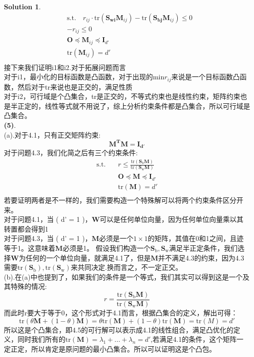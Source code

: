 \documentclass[a4paper]{article}
\numberwithin{equation}{section}
\theoremstyle{definition}
\newtheorem*{solution}{Solution}
\def \Sw {\mathbf{S}_{\mathrm{w}}}
\def \Sb {\mathbf{S}_{\mathrm{b}}}
\def \O {\mathbf{O}}
\def \I {\mathbf{I}}
\def \M {\mathbf{M}}
\def \W {\mathbf{W}}
\newcommand\sbr[1]{\left( #1 \right)}
\newcommand\tr[1]{\mathrm{tr}\sbr{#1}}
\begin{document}
\begin{solution}
\begin{equation}
\begin{aligned}
		& \mathrm{s.t.} \quad  r_{ij} \cdot \tr{\mathbf{S_{wi}} \M_{ij}} - \tr{\mathbf{S_{bj}} \M_{ij}} \leqslant 0 \\
		& -r_{ij} \leqslant 0    \\
		& \O \preccurlyeq \M_{ij} \preccurlyeq \I_{d'}  \\
		& \tr{\M_{ij}} = d'  \\
		\end{aligned}
	\label{equation}
	\end{equation}
	接下来我们证明i1和i2.对于拓展问题而言\\
	对于i1，最小化的目标函数是凸函数，对于出现的min$r_{ij}$来说是一个目标函数凸函数，然后对于tr来说也是正交的，满足性质\\
	对于i2，可行域是个凸集合，tr是正交的，不等式约束也是线性约束，矩阵约束也是半正定的，线性等式就不用说了，综上分析约束条件都是凸集合，所以可行域是凸集合。\\
	\textbf{(5)}.\\
	(a).对于4.1，只有正交矩阵约束:
	\[
		\mathbf{M^T}\mathbf{M} = \mathbf{I_{d'}}	
	\]
	对于问题4.3，我们化简之后有三个约束条件:
	\begin{equation}
		\begin{aligned}                                        
			\mathrm{s.t.} \quad & r \leq \frac{\tr{\Sb \M}}{\tr{\Sw \M}}        \\
			\quad               & \O \preccurlyeq \M \preccurlyeq \I_{d'}       \\
			\quad               & \tr{\M} = d'                                  \\
		\end{aligned}
		\label{lda1-slack}
	\end{equation}
	若要证明两者是不一样的，我们需要构造一个特殊解可以将两个约束条件区分开来。\\
	对于问题4.1，当 ( d' = 1 )，$\W$可以是任何单位向量，因为任何单位向量乘以其转置都会得到1\\
	对于问题4.3，当 ( d' = 1 )，$\M$必须是一个$1 \times 1 $的矩阵，其值在0和1之间，且迹等于1。这意味着$\M$必须是1。
	假设我们构造一个$\Sb,\Sw$满足半正定条件，我们选择$\W$为任何的一个单位向量，就满足4.1了，但是$\M$并不满足4.3的约束，因为4.3需要$\tr{\Sb},\tr{\Sw}$来共同决定.换而言之，不一定正交。\\
    (b).在(a)中也提到了，如果我们的条件是一个等式，我们其实可以得到这是一个及其特殊的情况:\\
	\[
		r = \frac{\text{tr}(\Sb \M)}{\text{tr}(\Sw \M)}    
	\]
   	而此时r要大于等于0，这个形式对于4.1而言，根据凸集合的定义，解出可得：
    \[
        \tr{\theta \M + (1-\theta) \M }= \theta\tr{\M} + (1-\theta)\tr{\M} = \tr{M} = d' 
    \]
    所以这是个凸集合，即4.5的可行解可以表示成4.1的线性组合，满足凸优化的定义，同时我们所有的$\tr{\M} = \lambda_1 + ... + \lambda_n = d'$,若满足4.1的条件，这个矩阵一定正定，所以肯定是原问题的最小凸集合。所以可以证明这是个凸包。
\end{solution}
\end{document}
